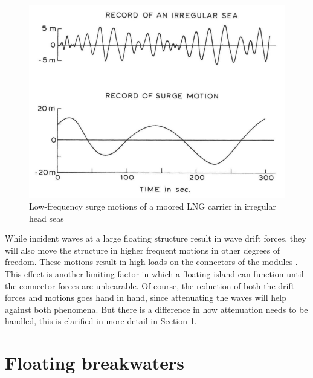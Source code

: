 \begin{figure}
    \centering
    \includegraphics[width=0.7\linewidth]{figures/Literature_Introduction/large_amplitude_low_freq_motions.PNG}
    \caption{Low-frequency surge motions of a moored LNG carrier in irregular head seas \citep{Pinkster1980}}
    \label{fig: low freq surge motions}
\end{figure}



While incident waves at a large floating structure result in wave drift forces, they will also move the structure in higher frequent motions in other degrees of freedom. These motions result in high loads on the connectors of the modules \citep{Isope2019}. This effect is another limiting factor in which a floating island can function until the connector forces are unbearable. Of course, the reduction of both the drift forces and motions goes hand in hand, since attenuating the waves will help against both phenomena. But there is a difference in how attenuation needs to be handled, this is clarified in more detail in Section \ref{sec: floating breakwaters}.









\section{Floating breakwaters}
\label{sec: floating breakwaters}

